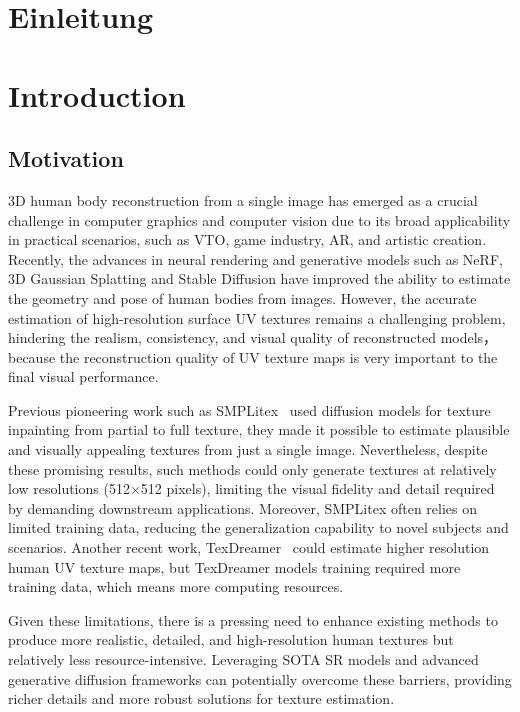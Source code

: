 {\chapter{Einleitung}}
{\chapter{Introduction}}

\label{sec:introduction}


\section{Motivation}
3D human body reconstruction from a single image has emerged as a crucial challenge in computer graphics and computer vision due to its broad applicability in practical scenarios, such as \ac{VTO}, game industry, \ac{AR}, and artistic creation. Recently, the advances in neural rendering and generative models such as NeRF\cite{mildenhall2020nerf}, 3D Gaussian Splatting\cite{kerbl3Dgaussians} and Stable Diffusion\cite{rombach2021highresolution} have improved the ability to estimate the geometry and pose of human bodies from images. However, the accurate estimation of high-resolution surface UV textures remains a challenging problem, hindering the realism, consistency, and visual quality of reconstructed models，because the reconstruction quality of UV texture maps is very important to the final visual performance.

Previous pioneering work such as SMPLitex~\cite{casas2023smplitex} used diffusion models for texture inpainting from partial to full texture, they made it possible to estimate plausible and visually appealing textures from just a single image. Nevertheless, despite these promising results, such methods could only generate textures at relatively low resolutions (512×512 pixels), limiting the visual fidelity and detail required by demanding downstream applications. Moreover, SMPLitex often relies on limited training data, reducing the generalization capability to novel subjects and scenarios. Another recent work, TexDreamer~\cite{liu2024texdreamer} could estimate higher resolution human UV texture maps, but TexDreamer models training required more training data, which means more computing resources. 

Given these limitations, there is a pressing need to enhance existing methods to produce more realistic, detailed, and high-resolution human textures but relatively less resource-intensive. Leveraging \ac{SOTA} \ac{SR} models and advanced generative diffusion frameworks can potentially overcome these barriers, providing richer details and more robust solutions for texture estimation.

